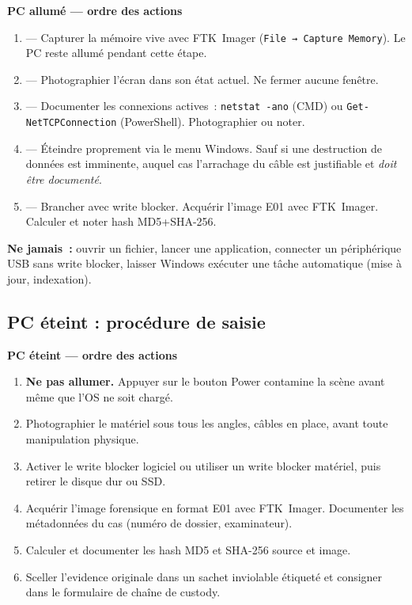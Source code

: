 \begin{boxPNC}
\textbf{PC allumé --- ordre des actions}

\begin{enumerate}
    \item {} --- Capturer la mémoire vive avec FTK~Imager
          (\texttt{File → Capture Memory}). Le PC reste allumé pendant
          cette étape.
    \item {} --- Photographier l'écran dans son état
          actuel. Ne fermer aucune fenêtre.
    \item {} --- Documenter les connexions actives~:
          \texttt{netstat -ano} (CMD) ou \texttt{Get-NetTCPConnection}
          (PowerShell). Photographier ou noter.
    \item {} --- Éteindre proprement via le menu Windows.
          Sauf si une destruction de données est imminente, auquel cas
          l'arrachage du câble est justifiable et \emph{doit être documenté}.
    \item {} --- Brancher avec write blocker. Acquérir
          l'image E01 avec FTK~Imager. Calculer et noter hash MD5+SHA-256.
\end{enumerate}

\medskip
\textbf{Ne jamais~:} ouvrir un fichier, lancer une application, connecter
un périphérique USB sans write blocker, laisser Windows exécuter une tâche
automatique (mise à jour, indexation).
\end{boxPNC}

\subsection{PC éteint : procédure de saisie}

\begin{boxPNC}
\textbf{PC éteint --- ordre des actions}

\begin{enumerate}
    \item \textbf{Ne pas allumer.} Appuyer sur le bouton Power contamine
          la scène avant même que l'OS ne soit chargé.
    \item Photographier le matériel sous tous les angles, câbles en place,
          avant toute manipulation physique.
    \item Activer le write blocker logiciel ou utiliser un write blocker
          matériel, puis retirer le disque dur ou SSD.
    \item Acquérir l'image forensique en format E01 avec FTK~Imager.
          Documenter les métadonnées du cas (numéro de dossier, examinateur).
    \item Calculer et documenter les hash MD5 et SHA-256 source et image.
    \item Sceller l'evidence originale dans un sachet inviolable étiqueté
          et consigner dans le formulaire de chaîne de custody.
\end{enumerate}
\end{boxPNC}

